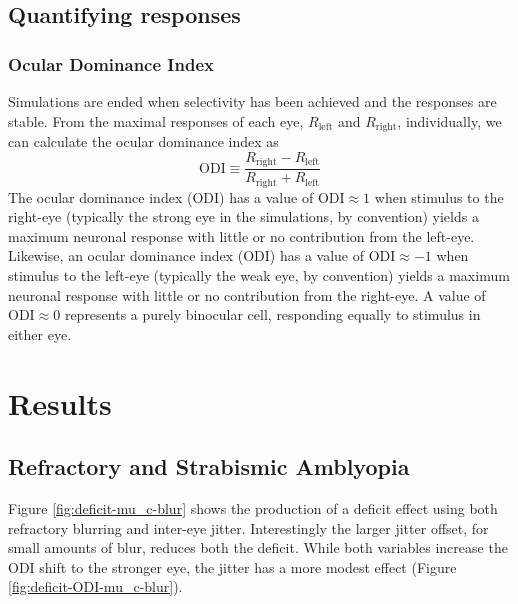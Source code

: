 \documentclass[
  onecolumn]{article}
\begin{document}
\hypertarget{quantifying-responses}{%
\subsection{Quantifying responses}\label{quantifying-responses}}

\hypertarget{ocular-dominance-index}{%
\subsubsection{Ocular Dominance Index}\label{ocular-dominance-index}}

Simulations are ended when selectivity has been achieved and the
responses are stable. From the maximal responses of each eye,
\(R_{\text{left}}\) and \(R_{\text{right}}\), individually, we can
calculate the ocular dominance index as \[
\text{ODI} \equiv \frac{R_{\text{right}}-R_{\text{left}}}{R_{\text{right}}+R_{\text{left}}}
\] The ocular dominance index (ODI) has a value of
\(\text{ODI} \approx 1\) when stimulus to the right-eye (typically the
strong eye in the simulations, by convention) yields a maximum neuronal
response with little or no contribution from the left-eye. Likewise, an
ocular dominance index (ODI) has a value of \(\text{ODI} \approx -1\)
when stimulus to the left-eye (typically the weak eye, by convention)
yields a maximum neuronal response with little or no contribution from
the right-eye. A value of \(\text{ODI} \approx 0\) represents a purely
binocular cell, responding equally to stimulus in either eye.

\hypertarget{results}{%
\section{Results}\label{results}}

\hypertarget{refractory-and-strabismic-amblyopia}{%
\subsection{Refractory and Strabismic
Amblyopia}\label{refractory-and-strabismic-amblyopia}}

Figure \ref{fig:deficit-mu_c-blur} shows the production of a deficit
effect using both refractory blurring and inter-eye jitter.
Interestingly the larger jitter offset, for small amounts of blur,
reduces both the deficit. While both variables increase the ODI shift to
the stronger eye, the jitter has a more modest effect (Figure
\ref{fig:deficit-ODI-mu_c-blur}).
\end{document}
